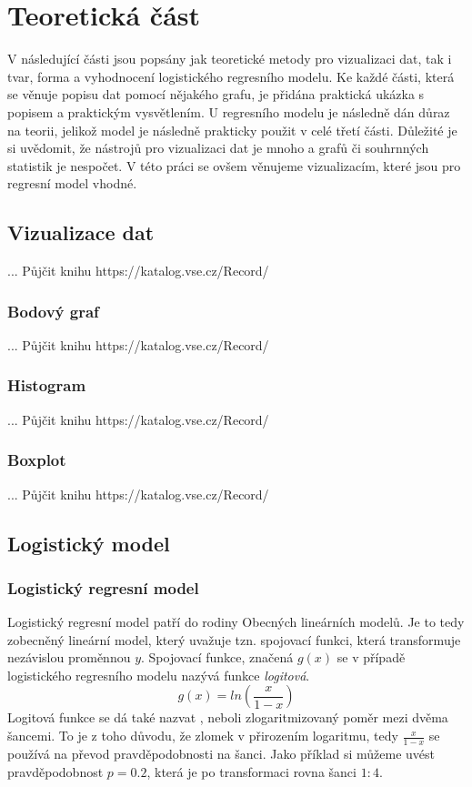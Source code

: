 \chapter{Teoretická část}
V následující části jsou popsány jak teoretické metody pro vizualizaci dat, tak i tvar, forma a vyhodnocení logistického regresního modelu. 
Ke každé části, která se věnuje popisu dat pomocí nějakého grafu, je přidána praktická ukázka s popisem a praktickým vysvětlením. U regresního 
modelu je následně dán důraz na teorii, jelikož model je následně prakticky použit v celé třetí části. Důležité je si uvědomit, že nástrojů pro
vizualizaci dat je mnoho a grafů či souhrnných statistik je nespočet. V této práci se ovšem věnujeme vizualizacím, které jsou pro regresní model
vhodné.
\section{Vizualizace dat}
... Půjčit knihu https://katalog.vse.cz/Record/

\subsection{Bodový graf}
... Půjčit knihu https://katalog.vse.cz/Record/

\subsection{Histogram}
... Půjčit knihu https://katalog.vse.cz/Record/

\subsection{Boxplot}
... Půjčit knihu https://katalog.vse.cz/Record/

\section{Logistický model}
\subsection{Logistický regresní model}
Logistický regresní model patří do rodiny Obecných lineárních modelů. Je to tedy zobecněný lineární model, který uvažuje tzn. spojovací funkci, která transformuje
nezávislou proměnnou $y$. Spojovací funkce, značená $g(x)$ se v případě logistického regresního modelu nazývá funkce \textit{logitová}.
\begin{equation}
    g(x) = ln\left(\frac{x}{1 - x}\right)
\end{equation}
Logitová funkce se dá také nazvat , neboli zlogaritmizovaný poměr mezi dvěma šancemi. To je z toho důvodu, že zlomek v přirozením logaritmu, tedy
$\frac{x}{1-x}$ se používá na převod pravděpodobnosti na šanci. Jako příklad si můžeme uvést pravděpodobnost $p = 0.2$, která je po transformaci rovna šanci $1:4$.

